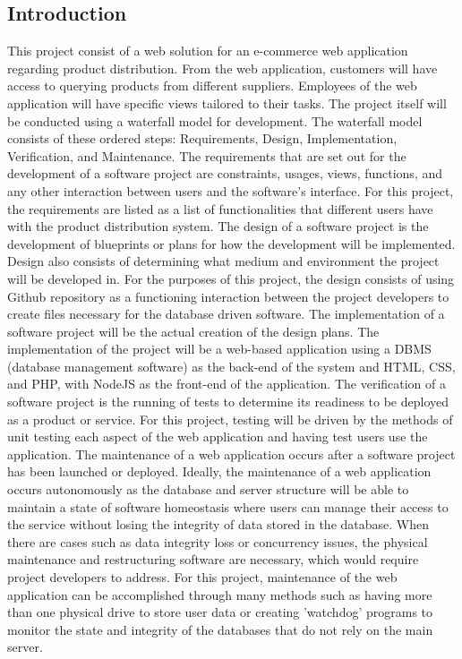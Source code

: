 \documentclass[12pt]{article}
\begin{document}
\begin{myspace}{1.7}
        
\section*{Introduction}  
	This project consist of a web solution for an e-commerce web application regarding product distribution. From the web application, customers will have access to querying products from different suppliers. Employees of the web application will have specific views tailored to their tasks. The project itself will be conducted using a waterfall model \cite {waterfall} for development.
	The waterfall model consists of these ordered steps: Requirements, Design, Implementation, Verification, and Maintenance.
	The requirements that are set out for the development of a software project are constraints, usages, views, functions, and any other interaction between users and the software's interface. For this project, the requirements are listed as a list of functionalities that different users have with the product distribution system.
	The design of a software project is the development of blueprints or plans for how the development will be implemented. Design also consists of determining what medium and environment the project will be developed in. For the purposes of this project, the design consists of using Github repository as a functioning interaction between the project developers to create files necessary for the database driven software.
	The implementation of a software project will be the actual creation of the design plans. The implementation of the project will be a web-based application using a DBMS (database management software) as the back-end of the system and HTML, CSS, and PHP, with NodeJS as the front-end of the application.
	The verification of a software project is the running of tests to determine its readiness to be deployed as a product or service. For this project, testing will be driven by the methods of unit testing each aspect of the web application and having test users use the application.
	The maintenance of a web application occurs after a software project has been launched or deployed. Ideally, the maintenance of a web application occurs autonomously as the database and server structure will be able to maintain a state of software homeostasis where users can manage their access to the service without losing the integrity of data stored in the database. When there are cases such as data integrity loss or concurrency issues, the physical maintenance and restructuring software are necessary, which would require project developers to address. For this project, maintenance of the web application can be accomplished through many methods such as having more than one physical drive to store user data or creating 'watchdog' programs to monitor the state and integrity of the databases that do not rely on the main server.
	


\end{myspace}
\end{document}
